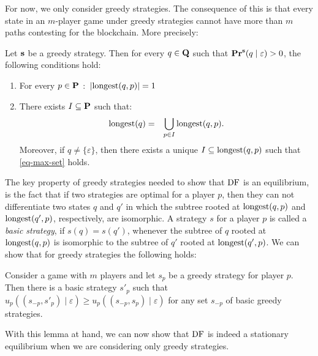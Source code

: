 For now, we only consider greedy strategies. 
%
The consequence of this is that every state in an $m$-player game under greedy strategies cannot have more than $m$ paths contesting for the blockchain. More precisely:%
\begin{mylem}\label{lem-length-greedy}
Let $\mathbf{s}$ be a greedy strategy. Then for every $q \in \mathbf{Q}$ such that $\mathbf{Pr}^{\mathbf{s}}(q \mid \varepsilon) > 0$, the following conditions hold:
\begin{enumerate}
\item For every $p \in \mathbf{P}$ $:$ $|{\text{\rm longest}}(q,p)| = 1$ 

\item There exists $I \subseteq \mathbf{P}$ such that$:$
\begin{eqnarray}\label{eq-max-set}
{\text{\rm longest}}(q) & = & \bigcup_{p \in I} {\text{\rm longest}}(q,p).
\end{eqnarray}
Moreover, if $q \neq \{\varepsilon\}$, then there exists a unique $I \subseteq {\text{\rm longest}}(q,p)$ such that \eqref{eq-max-set} holds.
\end{enumerate}
\end{mylem}

The key property of greedy strategies needed to show that $\text{\rm DF}$ is an equilibrium, is the fact that if two strategies are optimal for a player $p$, then they can not differentiate two states $q$ and $q'$ in which the subtree rooted at ${\text{\rm longest}}(q,p)$ and ${\text{\rm longest}}(q',p)$, respectively, are isomorphic. A strategy $s$ for a player $p$ is called a {\em basic strategy}, if $s(q)=s(q')$, whenever the subtree of $q$ rooted at ${\text{\rm longest}}(q,p)$ is isomorphic to the subtree of $q'$ rooted at ${\text{\rm longest}}(q',p)$. We can show that for greedy strategies the following holds:

\begin{mylem}
\label{lem-meet}
Consider a game with $m$ players and let $s_p$ be a greedy strategy for player $p$. Then there is a basic strategy $s'_p$ such that $u_p((s_{-p},s'_p) \mid \varepsilon) \geq u_p((s_{-p},s_p) \mid \varepsilon)$ for any set $s_{-p}$ of basic greedy strategies.  
\end{mylem}


With this lemma at hand, we can now show that $\text{\rm DF}$ is indeed a stationary equilibrium when we are considering only greedy strategies.

